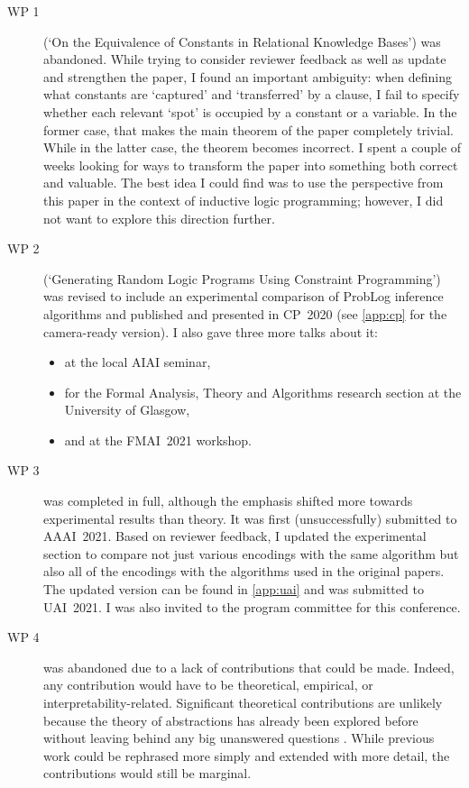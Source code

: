 \documentclass{article}
\begin{document}
\begin{description}
\item[WP 1] (`On the Equivalence of Constants in Relational Knowledge Bases')
  was abandoned. While trying to consider reviewer feedback as well as update
  and strengthen the paper, I found an important ambiguity: when defining what
  constants are `captured' and `transferred' by a clause, I fail to specify
  whether each relevant `spot' is occupied by a constant or a variable. In the
  former case, that makes the main theorem of the paper completely trivial.
  While in the latter case, the theorem becomes incorrect. I spent a couple of
  weeks looking for ways to transform the paper into something both correct and
  valuable. The best idea I could find was to use the perspective from this
  paper in the context of inductive logic programming; however, I did not want
  to explore this direction further.
\item[WP 2] (`Generating Random Logic Programs Using Constraint
  Programming') was revised to include an experimental comparison of ProbLog
  inference algorithms and published and presented in CP~2020 (see \cref{app:cp}
  for the camera-ready version). I also gave three more talks about it:
  \begin{itemize}
  \item at the local AIAI seminar,
  \item for the Formal Analysis, Theory and Algorithms research section at the
    University of Glasgow,
  \item and at the FMAI~2021 workshop.
  \end{itemize}
\item[WP 3] was completed in full, although the emphasis shifted more towards
  experimental results than theory. It was first (unsuccessfully) submitted to
  AAAI~2021. Based on reviewer feedback, I updated the experimental section to
  compare not just various encodings with the same algorithm but also all of the
  encodings with the algorithms used in the original papers. The updated version
  can be found in \cref{app:uai} and was submitted to UAI~2021. I was also
  invited to the program committee for this conference.
\item[WP 4] was abandoned due to a lack of contributions that could be made.
  Indeed, any contribution would have to be theoretical, empirical, or
  interpretability-related. Significant theoretical contributions are unlikely
  because the theory of abstractions has already been explored before without
  leaving behind any big unanswered questions \cite{DBLP:journals/kbs/Belle20}.
  While previous work could be rephrased more simply and extended with more
  detail, the contributions would still be marginal.


\end{description}
\end{document}
